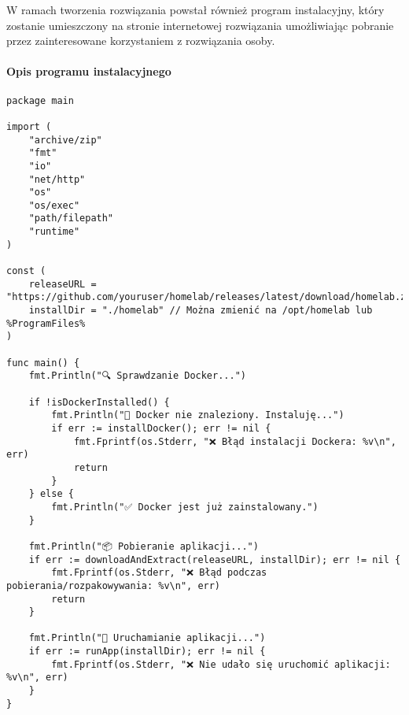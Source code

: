 W ramach tworzenia rozwiązania powstał również program instalacyjny, który zostanie umieszczony na stronie internetowej rozwiązania umożliwiając pobranie przez zainteresowane korzystaniem z rozwiązania osoby.
\paragraph{Opis programu instalacyjnego}

\begin{lstlisting}
package main

import (
	"archive/zip"
	"fmt"
	"io"
	"net/http"
	"os"
	"os/exec"
	"path/filepath"
	"runtime"
)

const (
	releaseURL = "https://github.com/youruser/homelab/releases/latest/download/homelab.zip"
	installDir = "./homelab" // Można zmienić na /opt/homelab lub %ProgramFiles%
)

func main() {
	fmt.Println("🔍 Sprawdzanie Docker...")

	if !isDockerInstalled() {
		fmt.Println("🚧 Docker nie znaleziony. Instaluję...")
		if err := installDocker(); err != nil {
			fmt.Fprintf(os.Stderr, "❌ Błąd instalacji Dockera: %v\n", err)
			return
		}
	} else {
		fmt.Println("✅ Docker jest już zainstalowany.")
	}

	fmt.Println("📦 Pobieranie aplikacji...")
	if err := downloadAndExtract(releaseURL, installDir); err != nil {
		fmt.Fprintf(os.Stderr, "❌ Błąd podczas pobierania/rozpakowywania: %v\n", err)
		return
	}

	fmt.Println("🚀 Uruchamianie aplikacji...")
	if err := runApp(installDir); err != nil {
		fmt.Fprintf(os.Stderr, "❌ Nie udało się uruchomić aplikacji: %v\n", err)
	}
}
\end{lstlisting}